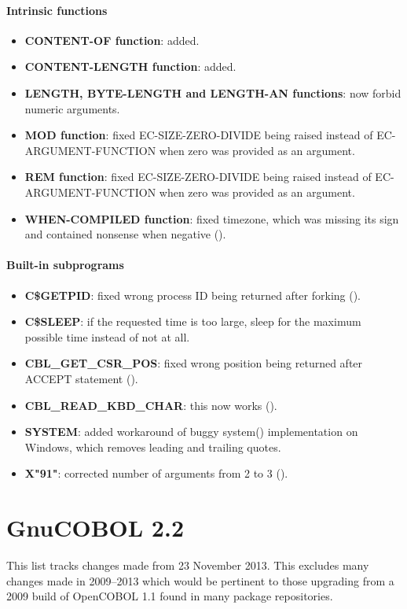 \paragraph{Intrinsic functions}
\begin{itemize}
\item \textbf{CONTENT-OF function}: added.
\item \textbf{CONTENT-LENGTH function}: added.
\item \textbf{LENGTH, BYTE-LENGTH and LENGTH-AN functions}: now forbid numeric arguments.
\item \textbf{MOD function}: fixed EC-SIZE-ZERO-DIVIDE being raised instead of EC-ARGUMENT-FUNCTION when zero was provided as an argument.
\item \textbf{REM function}: fixed EC-SIZE-ZERO-DIVIDE being raised instead of EC-ARGUMENT-FUNCTION when zero was provided as an argument.
\item \textbf{WHEN-COMPILED function}: fixed timezone, which was missing its sign and contained nonsense when negative ().
\end{itemize}

\paragraph{Built-in subprograms}
\begin{itemize}
\item \textbf{C\$GETPID}: fixed wrong process ID being returned after forking ().
\item \textbf{C\$SLEEP}: if the requested time is too large, sleep for the maximum possible time instead of not at all.
\item \textbf{CBL\_GET\_CSR\_POS}: fixed wrong position being returned after ACCEPT statement ().
\item \textbf{CBL\_READ\_KBD\_CHAR}: this now works ().
\item \textbf{SYSTEM}: added workaround of buggy system() implementation on Windows, which removes leading and trailing quotes.
\item \textbf{X"91"}: corrected number of arguments from 2 to 3 ().
\end{itemize}

\section{GnuCOBOL 2.2}

This list tracks changes made from 23 November 2013. This excludes many changes made in 2009--2013 which would be pertinent to those upgrading from a 2009 build of OpenCOBOL 1.1 found in many package repositories.

